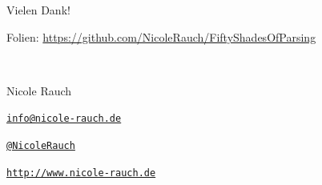 \begin{frame}{Vielen Dank!}

        Folien: \url{https://github.com/NicoleRauch/FiftyShadesOfParsing} 
        
        ~\\[1em]
        \begin{block}{Nicole Rauch}
        \begin{description}[Twitterxx]
                \item[E-Mail]  \href{mailto:info@nicole-rauch.de}{\texttt{info@nicole-rauch.de}}
                \item[Twitter] \href{http://twitter.com/NicoleRauch}{\texttt{@NicoleRauch}}
                \item[Web] \href{http://www.nicole-rauch.de}{\texttt{http://www.nicole-rauch.de}}
        \end{description}
        \end{block}
\end{frame}

